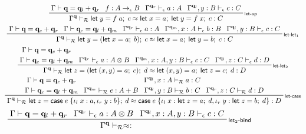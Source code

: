 \documentclass[acmsmall,screen,review]{acmart}
\newcommand{\mc}[1]{\ensuremath{\mathcal{#1}}}
\newcommand{\mb}[1]{\ensuremath{\mathbf{#1}}}
\newcommand{\ms}[1]{\ensuremath{\mathsf{#1}}}
\newcommand{\lto}{:}
\newcommand{\linl}[1]{\iota_l\;{#1}}
\newcommand{\linr}[1]{\iota_r\;{#1}}
\newcommand{\letexpr}[3]{\ensuremath{\ms{let}\;#1 = #2;\;#3}}
\newcommand{\caseexpr}[5]{\ms{case}\;#1\;\{\linl{#2} \lto #3, \linr{#4} \lto #5\}}
\newcommand{\qsp}[4]{#1 \vdash #2 = #3 + #4}
\newcommand{\rle}[1]{{\scriptsize\textsf{#1}}}
\newcommand{\hasty}[4]{#1 \vdash_{#2} #3: {#4}}
\newcommand{\teqv}{\approx}
\newcommand{\tmeq}[5]{#1 \vdash_{#2} #3 \teqv #4 : {#5}}
\begin{document}
\begin{figure}
  \begin{gather*}
    \prftree[r]{\rle{let-op}}
      {\qsp{\Gamma}{\mb{q}}{\mb{q}_l}{\mb{q}_r}}
      {f : A \to_\epsilon B}
      {\hasty{\Gamma^{\mb{q}_r}}{\epsilon}{a}{A}}
      {\hasty{\Gamma^{\mb{q}_l}, y : B}{\epsilon}{c}{C}}
      {\tmeq{\Gamma^{\mb{q}}}{\mc{R}}
        {\letexpr{y}{f\;a}{c}}
        {\letexpr{x}{a}{\letexpr{y}{f\;x}{c}}}
        {C}}
      \\
    \prftree[r]{\rle{let-let$_1$}}
      {\qsp{\Gamma}{\mb{q}}{\mb{q}_c}{\mb{q}_r}}
      {\qsp{\Gamma}{\mb{q}_c}{\mb{q}_l}{\mb{q}_m}}
      {\hasty{\Gamma^{\mb{q}_r}}{\epsilon}{a}{A}}
      {\hasty{\Gamma^{\mb{q}_m}, x : A}{\epsilon}{b}{B}}
      {\hasty{\Gamma^{\mb{q}_l}, y : B}{\epsilon}{c}{C}}
      {
        \tmeq{\Gamma^{\mb{q}}}{\mc{R}}
          {\letexpr{y}{(\letexpr{x}{a}{b})}{c}}
          {\letexpr{x}{a}{\letexpr{y}{b}{c}}}
          {C}
      }
      \\
    \prftree[r]{\rle{let-let$_2$}}
      {
        \prfStackPremises
        {\qsp{\Gamma}{\mb{q}}{\mb{q}_c}{\mb{q}_r}}
        {\qsp{\Gamma}{\mb{q}_c}{\mb{q}_l}{\mb{q}_m}}
      }
      {\hasty{\Gamma^{\mb{q}_r}}{\epsilon}{a}{A \otimes B}}
      {\hasty{\Gamma^{\mb{q}_m}, x : A, y : B}{\epsilon}{c}{C}}
      {\hasty{\Gamma^{\mb{q}_l}, z : C}{\epsilon}{d}{D}}
      {
        \tmeq{\Gamma^{\mb{q}}}{\mc{R}}
          {\letexpr{z}{(\letexpr{(x, y)}{a}{c})}{d}}
          {\letexpr{(x, y)}{a}{\letexpr{z}{c}{d}}}
          {D}
      }
      \\
    \prftree[r]{\rle{let-case}}
      {
        \prfStackPremises
        {\qsp{\Gamma}{\mb{q}}{\mb{q}_c}{\mb{q}_r}}
        {\qsp{\Gamma}{\mb{q}_c}{\mb{q}_l}{\mb{q}_m}}
      }
      {\hasty{\Gamma^{\mb{q}_m}}{\mc{R}}{e}{A + B}}
      {
        \prfStackPremises
        {\hasty{\Gamma^{\mb{q}_l}, x : A}{\mc{R}}{a}{C}}
        {\hasty{\Gamma^{\mb{q}_l}, y : B}{\mc{R}}{b}{C}}
      }
      {
        {\hasty{\Gamma^{\mb{q}_r}, z : C}{\mc{R}}{d}{D}}
      }
      {\tmeq{\Gamma^{\mb{q}}}{\mc{R}}
        {\letexpr{z}{\caseexpr{e}{x}{a}{y}{b}}{d}}
        {\caseexpr{e}{x}{\letexpr{z}{a}{d}}{y}{\letexpr{z}{b}{d}}}
        {D}
      } 
  \end{gather*}
  \begin{gather*}
    \prftree[r]{\rle{let$_2$-bind}}
      {\qsp{\Gamma}{\mb{q}}{\mb{q}_l}{\mb{q}_r}}
      {\hasty{\Gamma^{\mb{q}_r}}{\epsilon}{a}{A \otimes B}}
      {\hasty{\Gamma^{\mb{q}_l}, x : A, y : B}{\epsilon}{c}{C}}
      {
        \tmeq{\Gamma^{\mb{q}}}{\mc{R}}
}
\end{gather*}
\end{figure}
\end{document}
